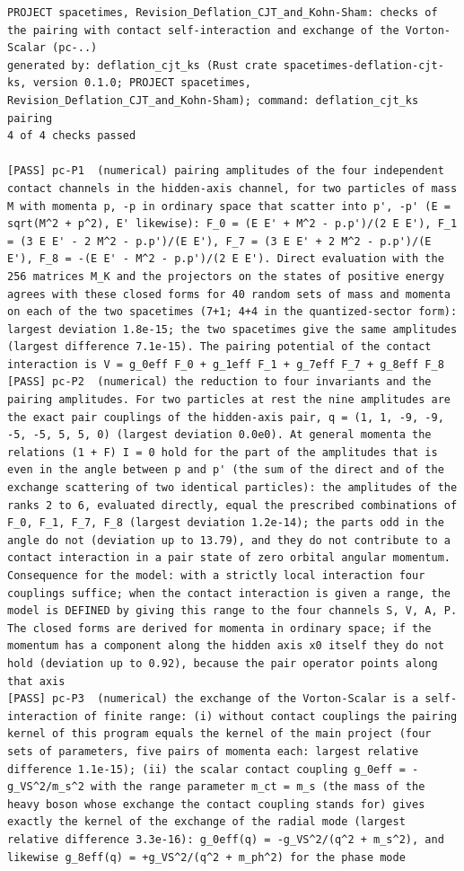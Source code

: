 \documentclass[
  10pt,
]{article}
\begin{document}
\begin{verbatim}
PROJECT spacetimes, Revision_Deflation_CJT_and_Kohn-Sham: checks of the pairing with contact self-interaction and exchange of the Vorton-Scalar (pc-..)
generated by: deflation_cjt_ks (Rust crate spacetimes-deflation-cjt-ks, version 0.1.0; PROJECT spacetimes, Revision_Deflation_CJT_and_Kohn-Sham); command: deflation_cjt_ks pairing
4 of 4 checks passed

[PASS] pc-P1  (numerical) pairing amplitudes of the four independent contact channels in the hidden-axis channel, for two particles of mass M with momenta p, -p in ordinary space that scatter into p', -p' (E = sqrt(M^2 + p^2), E' likewise): F_0 = (E E' + M^2 - p.p')/(2 E E'), F_1 = (3 E E' - 2 M^2 - p.p')/(E E'), F_7 = (3 E E' + 2 M^2 - p.p')/(E E'), F_8 = -(E E' - M^2 - p.p')/(2 E E'). Direct evaluation with the 256 matrices M_K and the projectors on the states of positive energy agrees with these closed forms for 40 random sets of mass and momenta on each of the two spacetimes (7+1; 4+4 in the quantized-sector form): largest deviation 1.8e-15; the two spacetimes give the same amplitudes (largest difference 7.1e-15). The pairing potential of the contact interaction is V = g_0eff F_0 + g_1eff F_1 + g_7eff F_7 + g_8eff F_8
[PASS] pc-P2  (numerical) the reduction to four invariants and the pairing amplitudes. For two particles at rest the nine amplitudes are the exact pair couplings of the hidden-axis pair, q = (1, 1, -9, -9, -5, -5, 5, 5, 0) (largest deviation 0.0e0). At general momenta the relations (1 + F) I = 0 hold for the part of the amplitudes that is even in the angle between p and p' (the sum of the direct and of the exchange scattering of two identical particles): the amplitudes of the ranks 2 to 6, evaluated directly, equal the prescribed combinations of F_0, F_1, F_7, F_8 (largest deviation 1.2e-14); the parts odd in the angle do not (deviation up to 13.79), and they do not contribute to a contact interaction in a pair state of zero orbital angular momentum. Consequence for the model: with a strictly local interaction four couplings suffice; when the contact interaction is given a range, the model is DEFINED by giving this range to the four channels S, V, A, P. The closed forms are derived for momenta in ordinary space; if the momentum has a component along the hidden axis x0 itself they do not hold (deviation up to 0.92), because the pair operator points along that axis
[PASS] pc-P3  (numerical) the exchange of the Vorton-Scalar is a self-interaction of finite range: (i) without contact couplings the pairing kernel of this program equals the kernel of the main project (four sets of parameters, five pairs of momenta each: largest relative difference 1.1e-15); (ii) the scalar contact coupling g_0eff = -g_VS^2/m_s^2 with the range parameter m_ct = m_s (the mass of the heavy boson whose exchange the contact coupling stands for) gives exactly the kernel of the exchange of the radial mode (largest relative difference 3.3e-16): g_0eff(q) = -g_VS^2/(q^2 + m_s^2), and likewise g_8eff(q) = +g_VS^2/(q^2 + m_ph^2) for the phase mode

\end{verbatim}
\end{document}
